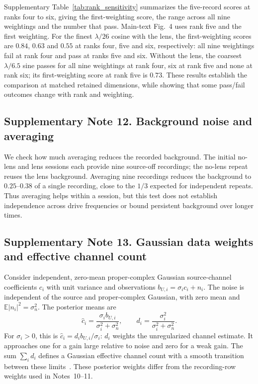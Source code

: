 \documentclass[pdflatex,sn-nature]{sn-jnl}%
\begin{document}
Supplementary Table~\ref{tab:rank_sensitivity} summarizes the five-record scores at ranks four to six, giving the first-weighting score, the range across all nine weightings and the number that pass. Main-text Fig.~4 uses rank five and the first weighting. For the finest $\lambda/26$ cosine with the lens, the first-weighting scores are $0.84$, $0.63$ and $0.55$ at ranks four, five and six, respectively: all nine weightings fail at rank four and pass at ranks five and six. Without the lens, the coarsest $\lambda/6.5$ sine passes for all nine weightings at rank four, six at rank five and none at rank six; its first-weighting score at rank five is $0.73$. These results establish the comparison at matched retained dimensions, while showing that some pass/fail outcomes change with rank and weighting.


\subsection*{Supplementary Note 12. Background noise and averaging}

We check how much averaging reduces the recorded background. The initial no-lens and lens sessions each provide nine source-off recordings;
the no-lens repeat reuses the lens background. Averaging nine recordings
reduces the background to $0.25$--$0.38$ of a single recording, close to
the $1/3$ expected for independent repeats. Thus averaging helps within a session, but this test does not establish independence across drive frequencies or bound persistent background over longer times.

\subsection*{Supplementary Note 13. Gaussian data weights and effective channel count}

Consider independent, zero-mean proper-complex Gaussian source-channel coefficients $c_i$ with unit variance and observations $b_{U,i}=\sigma_i c_i+n_i$. The noise is independent of the source and proper-complex Gaussian, with zero mean and $\mathbb E|n_i|^2=\sigma_n^2$. The posterior means are
\[
 \hat c_i=\frac{\sigma_i b_{U,i}}{\sigma_i^2+\sigma_n^2},
 \qquad d_i=\frac{\sigma_i^2}{\sigma_i^2+\sigma_n^2}.
\]
For $\sigma_i>0$, this is $\hat c_i=d_i b_{U,i}/\sigma_i$: $d_i$ weights the unregularized channel estimate. It approaches one for a gain large relative to noise and zero for a weak gain. The sum $\sum_i d_i$ defines a Gaussian effective channel count with a smooth transition between these limits~\cite{rodgers2000,antoni2012,stuart2010}. These posterior weights differ from the recording-row weights used in Notes~10--11.
\end{document}
